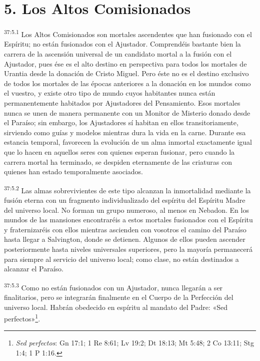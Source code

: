 \section*{5. Los Altos Comisionados}
\par
\textsuperscript{37:5.1} Los Altos Comisionados son mortales ascendentes que han fusionado con el Espíritu; no están fusionados con el Ajustador. Comprendéis bastante bien la carrera de la ascensión universal de un candidato mortal a la fusión con el Ajustador, pues ése es el alto destino en perspectiva para todos los mortales de Urantia desde la donación de Cristo Miguel. Pero éste no es el destino exclusivo de todos los mortales de las épocas anteriores a la donación en los mundos como el vuestro, y existe otro tipo de mundo cuyos habitantes nunca están permanentemente habitados por Ajustadores del Pensamiento. Esos mortales nunca se unen de manera permanente con un Monitor de Misterio donado desde el Paraíso; sin embargo, los Ajustadores sí habitan en ellos transitoriamente, sirviendo como guías y modelos mientras dura la vida en la carne. Durante esa estancia temporal, favorecen la evolución de un alma inmortal exactamente igual que lo hacen en aquellos seres con quienes esperan fusionar, pero cuando la carrera mortal ha terminado, se despiden eternamente de las criaturas con quienes han estado temporalmente asociados.

\par
\textsuperscript{37:5.2} Las almas sobrevivientes de este tipo alcanzan la inmortalidad mediante la fusión eterna con un fragmento individualizado del espíritu del Espíritu Madre del universo local. No forman un grupo numeroso, al menos en Nebadon. En los mundos de las mansiones encontraréis a estos mortales fusionados con el Espíritu y fraternizaréis con ellos mientras ascienden con vosotros el camino del Paraíso hasta llegar a Salvington, donde se detienen. Algunos de ellos pueden ascender posteriormente hasta niveles universales superiores, pero la mayoría permanecerá para siempre al servicio del universo local; como clase, no están destinados a alcanzar el Paraíso.

\par
\textsuperscript{37:5.3} Como no están fusionados con un Ajustador, nunca llegarán a ser finalitarios, pero se integrarán finalmente en el Cuerpo de la Perfección del universo local. Habrán obedecido en espíritu al mandato del Padre: «Sed perfectos»\footnote{\textit{Sed perfectos}: Gn 17:1; 1 Re 8:61; Lv 19:2; Dt 18:13; Mt 5:48; 2 Co 13:11; Stg 1:4; 1 P 1:16.}.

